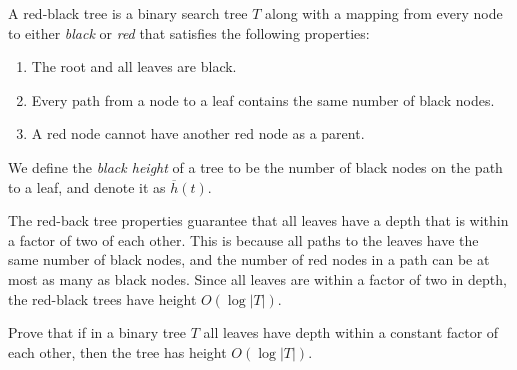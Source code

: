 \newcommand{\bh}{\overline{h}}
\begin{definition}
A red-black tree is a binary search tree $T$ along with a mapping from
every node to either \emph{black} or \emph{red} that satisfies the
following properties:
\begin{enumerate}
\item 
The root and all leaves are black.
\item
Every path from a node to a leaf contains the same number of black
nodes.
\item
A red node cannot have another red node as a parent.
\end{enumerate}
We define the \emph{black height} of a tree to be the number of black
nodes on the path to a leaf, and denote it as $\bh(t)$.
\end{definition}
The red-back tree properties guarantee that all leaves have a depth
that is within a factor of two of each other.      This is because
all paths to the leaves have the same number of black nodes, and the number
of red nodes in a path can be at most as many as black nodes.
Since all leaves are within a factor of two in depth,
the red-black trees have height $O(\log |T|)$.   
\begin{exercise}
Prove that if in a binary tree $T$ all leaves have depth within a constant
factor of each other, then the tree has height $O(\log |T|)$.
\end{exercise}

